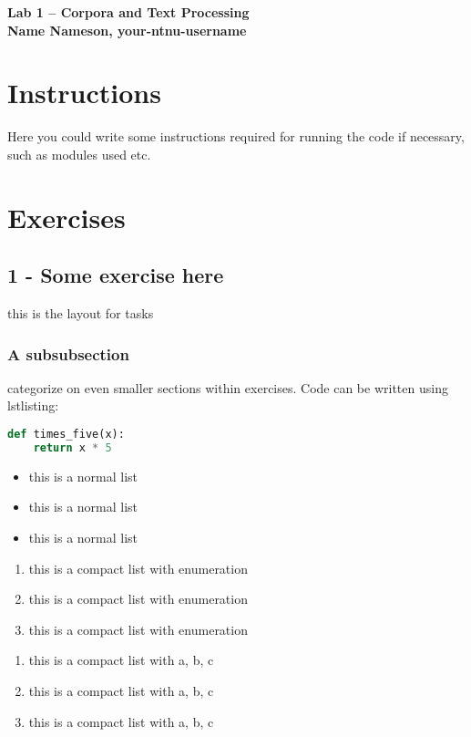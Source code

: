 \documentclass[a4paper,12pt,article]{memoir}
\begin{document}
\begin{center}
\Large{\textbf{Lab 1 -- Corpora and Text Processing}}
\\
\large{\textbf{Name Nameson, your-ntnu-username}}
\end{center}

\section*{Instructions}
Here you could write some instructions required for running the code if necessary, such as modules used etc.
\section*{Exercises}
\subsection{1 - Some exercise here}
this is the layout for tasks
\subsubsection{A subsubsection}
categorize on even smaller sections within exercises.
Code can be written using lstlisting:
\begin{lstlisting}[language=Python]
def times_five(x):
    return x * 5
\end{lstlisting}

\begin{itemize}
    \item this is a normal list
    \item this is a normal list
    \item this is a normal list
\end{itemize}

\begin{enumerate}\itemsep0em
    \item this is a compact list with enumeration
    \item this is a compact list with enumeration
    \item this is a compact list with enumeration
\end{enumerate}

\begin{enumerate}[label=(\alph*)]\itemsep0em
    \item this is a compact list with a, b, c
    \item this is a compact list with a, b, c
    \item this is a compact list with a, b, c
\end{enumerate}
\end{document}
